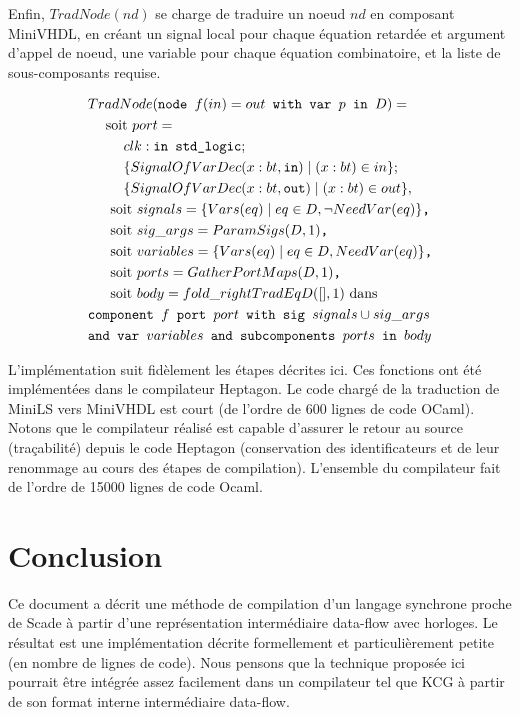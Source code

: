 \documentclass[a4paper]{article}
\newcommand{\LANG}{{\sc Heptagon}}
\newcommand{\scade}{{\sc Scade}}
\newcommand{\minils}{{\sc MiniLS}}
\newcommand{\heptagon}{{\sc Heptagon}}
\newcommand{\minivhdl}{{\sc MiniVHDL}}
\newcommand{\p}[0]{\; \vert \;}
\newcommand{\mybox}[1]{\mbox{\tt{#1}}}
\newcommand{\bl}[0]{\hspace{0.45cm}}
\begin{document}
Enfin, $TradNode(nd)$ se charge de traduire un noeud $nd$ en composant
\minivhdl{}, en cr\'eant un signal local pour chaque \'equation retard\'ee et
argument d'appel de noeud, une variable pour chaque \'equation combinatoire, et
la liste de sous-composants requise.

\begin{align*}
  & TradNode(\mybox{node } f(in) = out \mybox{ with var } p \mybox{ in } D) = \\
  & \bl \mbox{soit } port = \\
  & \bl \bl clk : \mybox{in std\_logic}; \\
  & \bl \bl \{ SignalOfVarDec(x : bt, \mybox{in}) \p (x : bt) \in in \}; \\
  & \bl \bl \{ SignalOfVarDec(x : bt, \mybox{out}) \p (x : bt) \in out \}, \\
  & \bl \mbox{ soit } signals = \{ \V{eq} \p eq \in D, \neg \NV{eq} \}
  \mybox{,} \\
  & \bl \mbox{ soit } sig\_args = \PS{D}{1} \mybox{,} \\
  & \bl \mbox{ soit } variables = \{ \V{eq} \p eq \in D, \NV{eq} \} \mybox{,} \\
  & \bl \mbox{ soit } ports = \GPM{D}{1} \mybox{,} \\
  & \bl \mbox{ soit } body = fold\_right TradEq D ([], 1) \mbox{ dans} \\
  & \mybox{component } f \mybox{ port } port \mybox{ with sig } signals \cup
  sig\_args \\
  & \mybox{and var } variables \mybox{ and subcomponents } ports \mybox{ in }
  body
\end{align*}

L'impl\'ementation suit fid\`element les \'etapes d\'ecrites ici. Ces fonctions
ont \'et\'e impl\'ement\'ees dans le compilateur \heptagon{}. Le code charg\'e de
la traduction de \minils{} vers \minivhdl{} est court (de l'ordre de
600 lignes de code OCaml). Notons que le compilateur r\'ealis\'e est
capable d'assurer le retour au source (tra\c{c}abilit\'e) depuis le code
\LANG{} (conservation des identificateurs et de leur renommage au
cours des \'etapes de compilation). L'ensemble du compilateur fait de
l'ordre de 15000 lignes de code Ocaml.

\section{Conclusion}

Ce document a d\'ecrit une m\'ethode de compilation d'un langage
synchrone proche de \scade{} \`a partir d'une repr\'esentation interm\'ediaire
data-flow avec horloges. Le r\'esultat est une impl\'ementation d\'ecrite formellement
et particuli\`erement petite (en nombre de lignes de code). Nous pensons
que la technique propos\'ee ici pourrait \^etre int\'egr\'ee assez facilement
dans un compilateur tel que KCG \`a partir de son format interne interm\'ediaire
data-flow.
\end{document}
